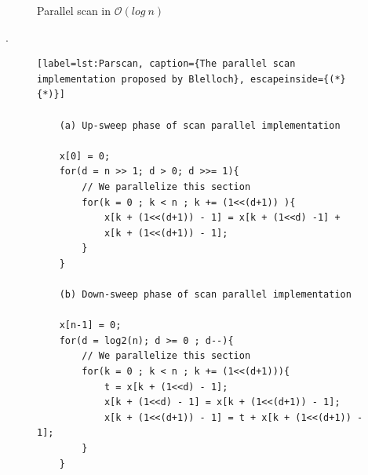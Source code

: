 \documentclass[Ingles]{ic-tese-v1}
\begin{document}
\begin{figure}[t]
	\centering
	\caption{Parallel scan in $\mathcal{O}(log\  n)$}
	\vfill
\end{figure}
.
\begin{figure}[t]
	\lstset{basicstyle=\scriptsize}
	\begin{lstlisting}[label=lst:Parscan, caption={The parallel scan implementation proposed by Blelloch}, escapeinside={(*}{*)}]

	(a) Up-sweep phase of scan parallel implementation

	x[0] = 0;
	for(d = n >> 1; d > 0; d >>= 1){
		// We parallelize this section
		for(k = 0 ; k < n ; k += (1<<(d+1)) ){
			x[k + (1<<(d+1)) - 1] = x[k + (1<<d) -1] +
			x[k + (1<<(d+1)) - 1];
		}
	}

	(b) Down-sweep phase of scan parallel implementation

	x[n-1] = 0;
	for(d = log2(n); d >= 0 ; d--){
		// We parallelize this section
		for(k = 0 ; k < n ; k += (1<<(d+1))){
			t = x[k + (1<<d) - 1];
			x[k + (1<<d) - 1] = x[k + (1<<(d+1)) - 1];
			x[k + (1<<(d+1)) - 1] = t + x[k + (1<<(d+1)) - 1];
		}
	}
	\end{lstlisting}
\end{figure}
\end{document}
